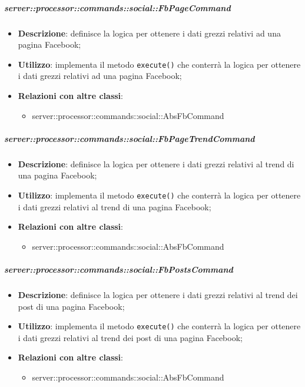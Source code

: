         \subparagraph{server::processor::commands::social::FbPageCommand} %
        \label{subp:bdsm_app_server_processor_commands_social_fbpagecommand}
        \begin{itemize}
          \item \textbf{Descrizione}: definisce la logica per ottenere i dati grezzi relativi ad una pagina Facebook;
          \item \textbf{Utilizzo}: implementa il metodo \texttt{execute()} che conterrà la logica per ottenere i dati grezzi relativi ad una pagina Facebook;
          \item \textbf{Relazioni con altre classi}:
            \begin{itemize}
              \item server::processor::commands::social::AbsFbCommand
            \end{itemize}
        \end{itemize}

        \subparagraph{server::processor::commands::social::FbPageTrendCommand} %
        \label{subp:bdsm_app_server_processor_commands_social_fbpagetrendcommand}
        \begin{itemize}
          \item \textbf{Descrizione}: definisce la logica per ottenere i dati grezzi relativi al trend di una pagina Facebook;
          \item \textbf{Utilizzo}: implementa il metodo \texttt{execute()} che conterrà la logica per ottenere i dati grezzi relativi al trend di una pagina Facebook;
          \item \textbf{Relazioni con altre classi}:
            \begin{itemize}
              \item server::processor::commands::social::AbsFbCommand
            \end{itemize}
        \end{itemize}

        \subparagraph{server::processor::commands::social::FbPostsCommand} %
        \label{subp:bdsm_app_server_processor_commands_social_fbpostscommand}
        \begin{itemize}
          \item \textbf{Descrizione}: definisce la logica per ottenere i dati grezzi relativi al trend dei post di una pagina Facebook;
          \item \textbf{Utilizzo}: implementa il metodo \texttt{execute()} che conterrà la logica per ottenere i dati grezzi relativi al trend dei post di una pagina Facebook;
          \item \textbf{Relazioni con altre classi}:
            \begin{itemize}
              \item server::processor::commands::social::AbsFbCommand
            \end{itemize}
        \end{itemize}

